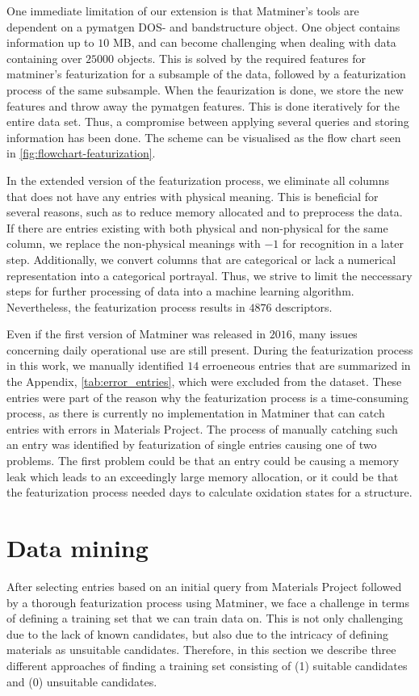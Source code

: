 \noindent One immediate limitation of our extension is that Matminer's tools are dependent on a pymatgen DOS- and bandstructure object. One object contains information up to $10$ MB, and can become challenging when dealing with data containing over $25000$ objects. This is solved by the required features for matminer's featurization for a subsample of the data, followed by a featurization process of the same subsample. When the feaurization is done, we store the new features and throw away the pymatgen features. This is done iteratively for the entire data set. Thus, a compromise between applying several queries and storing information has been done. The scheme can be visualised as the flow chart seen in \autoref{fig:flowchart-featurization}.

In the extended version of the featurization process, we eliminate all columns that does not have any entries with physical meaning. This is beneficial for several reasons, such as to reduce memory allocated and to preprocess the data. If there are entries existing with both physical and non-physical for the same column, we replace the non-physical meanings with $-1$ for recognition in a later step. Additionally, we convert columns that are categorical or lack a numerical representation into a categorical portrayal. Thus, we strive to limit the neccessary steps for further processing of data into a machine learning algorithm. Nevertheless, the featurization process results in $4876$ descriptors.

Even if the first version of Matminer was released in $2016$, many issues concerning daily operational use are still present. During the featurization process in this work, we manually identified $14$ erroeneous entries that are summarized in the Appendix, \autoref{tab:error_entries}, which were excluded from the dataset. These entries were part of the reason why the featurization process is a time-consuming process, as there is currently no implementation in Matminer that can catch entries with errors in Materials Project. The process of manually catching such an entry was identified by featurization of single entries causing one of two problems. The first problem could be that an entry could be causing a memory leak which leads to an exceedingly large memory allocation, or it could be that the featurization process needed days to calculate oxidation states for a structure.

\section{Data mining}
\label{sec:data mining}
After selecting entries based on an initial query from Materials Project followed by a thorough featurization process using Matminer, we face a challenge in terms of defining a training set that we can train data on. This is not only challenging due to the lack of known candidates, but also due to the intricacy of defining materials as unsuitable candidates. Therefore, in this section we describe three different approaches of finding a training set consisting of (1) suitable candidates and (0) unsuitable candidates.

